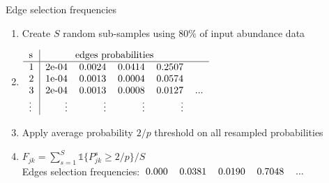 \documentclass[11pt]{beamer}
\newcommand{\emphase}[1]{\textcolor{Complement}{#1}}
\begin{document}
\begin{frame}{Edge selection frequencies}\small
\begin{enumerate}
\item Create \emphase{$S$ random sub-samples} using $80\%$ of input abundance data
\item \footnotesize $ 
\begin{tabular}{l|rrrrc}
s & \multicolumn{4}{c}{edges probabilities}&\\\hline
1&2e-04& 0.0024& 0.0414 &0.2507&\\
2&1e-04 &0.0013 &0.0004 &0.0574&\\
3&2e-04 &0.0013 &0.0008 &0.0127&...\\
\vdots&\vdots & \vdots & \vdots & \vdots&  
\end{tabular}$
\item   \small
Apply average probability \emphase{$2/p$ threshold} on all resampled probabilities

\item   $\displaystyle F_{jk} = \sum_{s=1}^S \mathds{1}\{P_{jk}^s\geq 2/p\}/S$\\
Edges selection frequencies:$
\begin{tabular}{rrrrc}
0.000 &0.0381 &0.0190 &0.7048&...
 \end{tabular}$

\end{enumerate}
 \end{frame}
\end{document}
